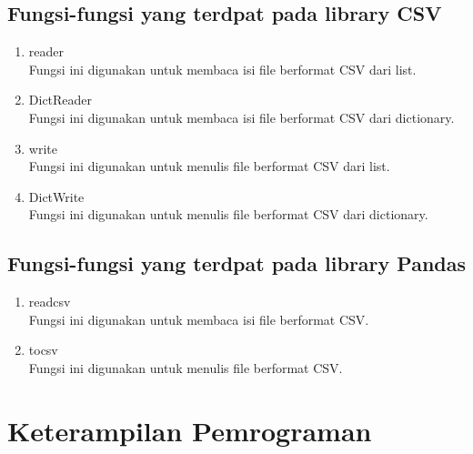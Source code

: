 \documentclass[12pt, times new roman]{report}
\begin{document}
\section{ Fungsi-fungsi yang terdpat pada library CSV}
\begin{enumerate}
\item reader\\
Fungsi ini digunakan untuk membaca isi file berformat CSV dari list.


\item DictReader\\
Fungsi ini digunakan untuk membaca isi file berformat CSV dari dictionary.


\item write\\
Fungsi ini digunakan untuk menulis file berformat CSV dari list.


\item DictWrite\\
Fungsi ini digunakan untuk menulis file berformat CSV dari dictionary.

\end{enumerate}

\section{ Fungsi-fungsi yang terdpat pada library Pandas}
\begin{enumerate}
\item read\textunderscore csv\\
Fungsi ini digunakan untuk membaca isi file berformat CSV.


\item to\textunderscore csv\\
Fungsi ini digunakan untuk menulis file berformat CSV.

\end{enumerate}

\chapter{Keterampilan Pemrograman}
\end{document}
